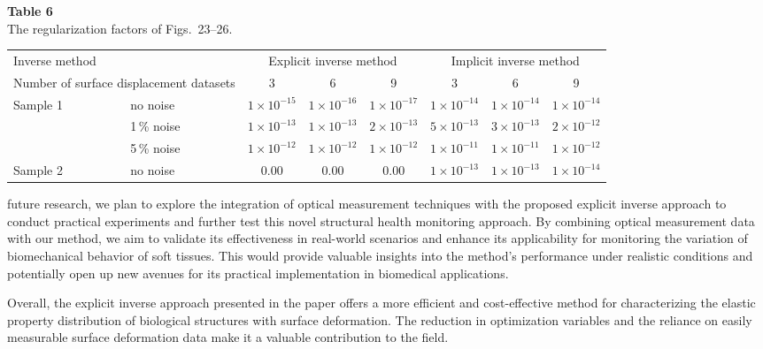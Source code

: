 \documentclass[11pt]{article}
\begin{document}
\vspace{1em}

\noindent\textbf{Table 6}\\[0.2em]
{\small The regularization factors of Figs.~23--26.}
\vspace{0.3em}

\begin{center}
\footnotesize
\begin{tabular}{@{}ll ccc ccc@{}}
\toprule
\multicolumn{2}{l}{Inverse method}
  & \multicolumn{3}{c}{Explicit inverse method}
  & \multicolumn{3}{c}{Implicit inverse method} \\
\cmidrule(lr){3-5}\cmidrule(lr){6-8}
\multicolumn{2}{l}{Number of surface displacement datasets}
  & 3 & 6 & 9 & 3 & 6 & 9 \\
\midrule
\multirow{3}{*}{Sample 1}
  & no noise    & $1\times 10^{-15}$ & $1\times 10^{-16}$ & $1\times 10^{-17}$ & $1\times 10^{-14}$ & $1\times 10^{-14}$ & $1\times 10^{-14}$ \\
  & 1\,\% noise & $1\times 10^{-13}$ & $1\times 10^{-13}$ & $2\times 10^{-13}$ & $5\times 10^{-13}$ & $3\times 10^{-13}$ & $2\times 10^{-12}$ \\
  & 5\,\% noise & $1\times 10^{-12}$ & $1\times 10^{-12}$ & $1\times 10^{-12}$ & $1\times 10^{-11}$ & $1\times 10^{-11}$ & $1\times 10^{-12}$ \\
\midrule
Sample 2 & no noise & 0.00 & 0.00 & 0.00 & $1\times 10^{-13}$ & $1\times 10^{-13}$ & $1\times 10^{-14}$ \\
\bottomrule
\end{tabular}
\end{center}

\vspace{1em}

\noindent
future research, we plan to explore the integration of optical
measurement techniques with the proposed explicit inverse
approach to conduct practical experiments and further test this
novel structural health monitoring approach. By combining
optical measurement data with our method, we aim to validate
its effectiveness in real-world scenarios and enhance its
applicability for monitoring the variation of biomechanical
behavior of soft tissues. This would provide valuable insights
into the method's performance under realistic conditions and
potentially open up new avenues for its practical implementation
in biomedical applications.

Overall, the explicit inverse approach presented in the paper
offers a more efficient and cost-effective method for
characterizing the elastic property distribution of biological
structures with surface deformation. The reduction in
optimization variables and the reliance on easily measurable
surface deformation data make it a valuable contribution to the
field.
\end{document}
